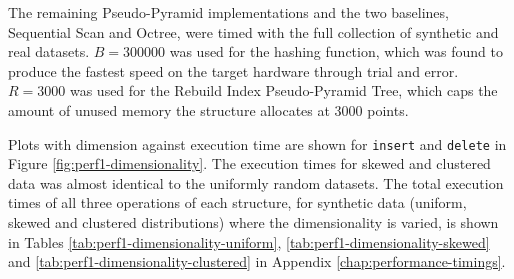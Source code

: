 The remaining Pseudo-Pyramid implementations and the two baselines, Sequential Scan and Octree, were timed with the full collection of synthetic and real datasets. $B = 300000$ was used for the hashing function, which was found to produce the fastest speed on the target hardware through trial and error. $R=3000$ was used for the Rebuild Index Pseudo-Pyramid Tree, which caps the amount of unused memory the structure allocates at 3000 points.

Plots with dimension against execution time are shown for \texttt{insert} and \texttt{delete} in Figure \ref{fig:perf1-dimensionality}. The execution times for skewed and clustered data was almost identical to the uniformly random datasets. The total execution times of all three operations of each structure, for synthetic data (uniform, skewed and clustered distributions) where the dimensionality is varied, is shown in Tables \ref{tab:perf1-dimensionality-uniform}, \ref{tab:perf1-dimensionality-skewed} and \ref{tab:perf1-dimensionality-clustered} in Appendix \ref{chap:performance-timings}.

